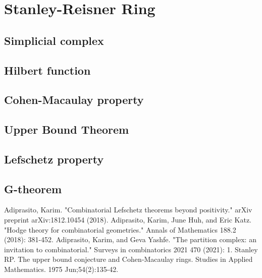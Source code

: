 \documentclass[12pt]{article}
\theoremstyle{definition}  %
\numberwithin{equation}{subsection}
\begin{document}
\section{Stanley-Reisner Ring}
\subsection{Simplicial complex}

\subsection{Hilbert function}

\subsection{Cohen-Macaulay property}

\subsection{Upper Bound Theorem}

\subsection{Lefschetz property}

\subsection{G-theorem}

\begin{thebibliography}{99}
Adiprasito, Karim. "Combinatorial Lefschetz theorems beyond positivity." arXiv preprint arXiv:1812.10454 (2018).
 Adiprasito, Karim, June Huh, and Eric Katz. "Hodge theory for combinatorial geometries." Annals of Mathematics 188.2 (2018): 381-452.
 Adiprasito, Karim, and Geva Yashfe. "The partition complex: an invitation to combinatorial." Surveys in combinatorics 2021 470 (2021): 1.
 Stanley RP. The upper bound conjecture and Cohen‐Macaulay rings. Studies in Applied Mathematics. 1975 Jun;54(2):135-42.



\end{thebibliography}
\end{document}
